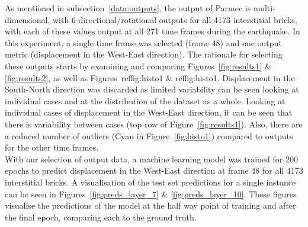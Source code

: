 As mentioned in subsection~\ref{data:outputs}, the output of Parmec is multi-dimensional, with 6 directional/rotational outputs for all 4173 interstitial bricks, with each of these values output at all 271 time frames during the earthquake. In this experiment, a single time frame was selected (frame 48) and one output metric (displacement in the West-East direction). The rationale for selecting these outputs starts by examining and comparing Figures~\ref{fig:results1} \& \ref{fig:results2}, as well as Figures~ref{fig:histo1} \& ref{fig:histo1}. Displacement in the South-North direction was discarded as limited variability can be seen looking at individual cases and at the distribution of the dataset as a whole. Looking at individual cases of displacement in the West-East direction, it can be seen that there is variability between cases (top row of Figure~\ref{fig:results1}). Also, there are a reduced number of outliers (Cyan in Figure~\ref{fig:histo1}) compared to outputs for the other time frames. 
\\

\noindent
With our selection of output data, a machine learning model was trained for 200 epochs to predict displacement in the West-East direction at frame 48 for all 4173 interstitial bricks. A visualisation of the test set predictions for a single instance can be seen in Figures~\ref{fig:preds_layer_7} \& \ref{fig:preds_layer_10}. These figures visualise the predictions of the model at the half way point of training and after the final epoch, comparing each to the ground truth.
\\

